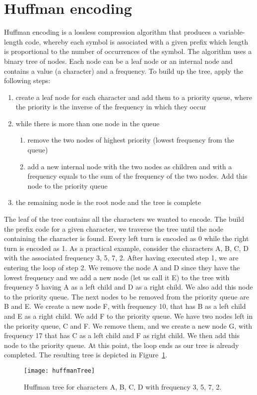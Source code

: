 \section{Huffman encoding}
Huffman encoding is a lossless compression algorithm that produces a variable-length code,
whereby each symbol is associated with a given prefix which length is proportional
to the number of occurrences of the symbol. The algorithm uses a binary tree of nodes.
Each node can be a leaf node or an internal node and contains a value (a character) and a
frequency. To build up the tree, apply the following steps:
\begin{enumerate}
    \item create a leaf node for each character and add them to a priority queue, where
    the priority is the inverse of the frequency in which they occur
    \item while there is more than one node in the queue
    \begin{enumerate}
        \item remove the two nodes of highest priority (lowest frequency from the queue)
        \item add a new internal node with the two nodes as children and with a frequency
        equals to the sum of the frequency of the two nodes. Add this node to the priority queue
    \end{enumerate}
    \item the remaining node is the root node and the tree is complete
\end{enumerate}
The leaf of the tree contains all the characters we wanted to encode. The build the prefix
code for a given character, we traverse the tree until the node containing the character is
found. Every left turn is encoded as 0 while the right turn is encoded as 1.
As a practical example, consider the characters A, B, C, D with the associated frequency
3, 5, 7, 2. After having executed step 1, we are entering the loop of step 2.
We remove the node A and D since they have the lowest frequency and we add a new node
(let us call it E) to the tree with frequency 5 having A as a left child and D as a right
child. We also add this node to the priority queue. The next nodes to be removed from the
priority queue are B and E. We create a new node F, with frequency 10, that has B as a left
child and E as a right child. We add F to the priority queue.
We have two nodes left in the priority queue, C and F. We remove them, and we create a new
node G, with frequency 17 that has C as a left child and F as right child. We then add this
node to the priority queue. At this point, the loop ends as our tree is already completed.
The resulting tree is depicted in Figure~\ref{huffman_tree}.

\begin{figure}[!htbp]
\begin{center}
\texttt{[image: huffmanTree]}
\caption[huffman_tree]{Huffman tree for characters A, B, C, D with frequency 3, 5, 7, 2.}
\label{huffman_tree}
\end{center}
\end{figure}